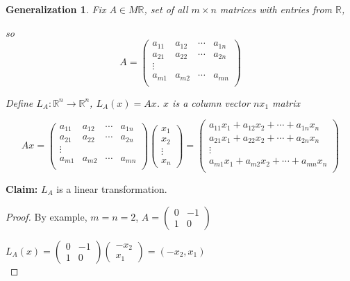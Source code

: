 \documentclass[12pt]{article}
\newtheorem{generalization}{Generalization}[subsection]
\newcommand{\mR}{{\mathbb{R}}}
\begin{document}
	\begin{generalization}
		Fix $A \in M \mR$, set of all $m\times n$ matrices with entries 
		from $\mR$, 

		so 
		\[
			A = 
			\begin{pmatrix}
				a_{11} & a_{12} & \cdots & a_{1n}\\
				a_{21} & a_{22} & \cdots & a_{2n}\\
				\vdots\\
				a_{m1} & a_{m2} & \cdots & a_{mn}\\
			\end{pmatrix}
		\]

		Define $L_A : \mR^n \to \mR^n$, $L_A(x) = Ax$. $x$ 
		is a column vector $nx_1$ matrix

		\[
			Ax = \begin{pmatrix}
				a_{11} & a_{12} & \cdots & a_{1n}\\
				a_{21} & a_{22} & \cdots & a_{2n}\\
				\vdots\\
				a_{m1} & a_{m2} & \cdots & a_{mn}\\
			\end{pmatrix}
			\begin{pmatrix}
				x_1\\
				x_2\\
				\vdots\\
				x_n
			\end{pmatrix}
			= \begin{pmatrix}
				a_{11}x_1 + a_{12} x_2 + \cdots + a_{1n}x_n\\
				a_{21}x_1 + a_{22} x_2 + \cdots + a_{2n}x_n\\
				\vdots\\
				a_{m1}x_1 + a_{m2} x_2 + \cdots + a_{mn}x_n\\
			\end{pmatrix}
		\]
	\end{generalization}

	\textbf{Claim: } $L_A$ is a linear transformation.
	\begin{proof}
		By example, $m = n = 2$, $A = \begin{pmatrix}
			0 & -1 \\
			1 & 0
		\end{pmatrix}$
		
		$L_A(x) = \begin{pmatrix}
			0 & -1 \\
			1 & 0
		\end{pmatrix}
		\begin{pmatrix}
			-x_2\\
			x_1
		\end{pmatrix}
		=(-x_2,x_1)$\\
	\end{proof}
	
\end{document}
